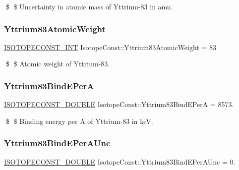 \$ \$ Uncertainty in atomic mass of Yttrium-\/83 in amu. \mbox{\label{group___isotope_const-_yttrium-_y83_gafb27dd38426e24b6e2373e93b2f5ba0a}} 
\subsubsection{\texorpdfstring{Yttrium83\+Atomic\+Weight}{Yttrium83AtomicWeight}}
{\footnotesize\ttfamily \mbox{\hyperlink{group___isotope_const-_macros_ga5f18360b3e99483a35c32d789e62621c}{I\+S\+O\+T\+O\+P\+E\+C\+O\+N\+S\+T\+\_\+\+I\+NT}} Isotope\+Const\+::\+Yttrium83\+Atomic\+Weight = 83}

\$ \$ Atomic weight of Yttrium-\/83. \mbox{\label{group___isotope_const-_yttrium-_y83_ga58c0026c2203873bb6f074f34226dc3e}} 
\subsubsection{\texorpdfstring{Yttrium83\+Bind\+E\+PerA}{Yttrium83BindEPerA}}
{\footnotesize\ttfamily \mbox{\hyperlink{group___isotope_const-_macros_ga8f45a7272ce02c0b4c65c44636ed719a}{I\+S\+O\+T\+O\+P\+E\+C\+O\+N\+S\+T\+\_\+\+D\+O\+U\+B\+LE}} Isotope\+Const\+::\+Yttrium83\+Bind\+E\+PerA = 8573.}

\$ \$ Binding energy per A of Yttrium-\/83 in keV. \mbox{\label{group___isotope_const-_yttrium-_y83_ga35765208cefefc837561a2aa9d83c315}} 
\subsubsection{\texorpdfstring{Yttrium83\+Bind\+E\+Per\+A\+Unc}{Yttrium83BindEPerAUnc}}
{\footnotesize\ttfamily \mbox{\hyperlink{group___isotope_const-_macros_ga8f45a7272ce02c0b4c65c44636ed719a}{I\+S\+O\+T\+O\+P\+E\+C\+O\+N\+S\+T\+\_\+\+D\+O\+U\+B\+LE}} Isotope\+Const\+::\+Yttrium83\+Bind\+E\+Per\+A\+Unc = 0.}

